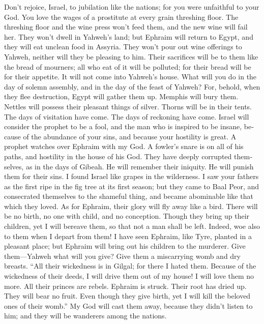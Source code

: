 \begin{paracol}{2}
\begin{otherlanguage}{english}
 Don't rejoice, Israel, to jubilation like the nations;
for you were unfaithful to your God. You love the wages of a prostitute
at every grain threshing floor.  The threshing floor and
the wine press won't feed them, and the new wine will fail her.
 They won't dwell in Yahweh's land; but Ephraim will
return to Egypt, and they will eat unclean food in Assyria.
 They won't pour out wine offerings to Yahweh, neither
will they be pleasing to him. Their sacrifices will be to them like the
bread of mourners; all who eat of it will be polluted; for their bread
will be for their appetite. It will not come into Yahweh's house.
 What will you do in the day of solemn assembly, and in
the day of the feast of Yahweh?  For, behold, when they
flee destruction, Egypt will gather them up. Memphis will bury them.
Nettles will possess their pleasant things of silver. Thorns will be in
their tents.  The days of visitation have come. The days
of reckoning have come. Israel will consider the prophet to be a fool,
and the man who is inspired to be insane, because of the abundance of
your sins, and because your hostility is great.  A prophet
watches over Ephraim with my God. A fowler's snare is on all of his
paths, and hostility in the house of his God.  They have
deeply corrupted themselves, as in the days of Gibeah. He will remember
their iniquity. He will punish them for their sins.  I
found Israel like grapes in the wilderness. I saw your fathers as the
first ripe in the fig tree at its first season; but they came to Baal
Peor, and consecrated themselves to the shameful thing, and became
abominable like that which they loved.  As for Ephraim,
their glory will fly away like a bird. There will be no birth, no one
with child, and no conception.  Though they bring up
their children, yet I will bereave them, so that not a man shall be
left. Indeed, woe also to them when I depart from them! 
I have seen Ephraim, like Tyre, planted in a pleasant place; but Ephraim
will bring out his children to the murderer.  Give
them---Yahweh what will you give? Give them a miscarrying womb and dry
breasts.  ``All their wickedness is in Gilgal; for there
I hated them. Because of the wickedness of their deeds, I will drive
them out of my house! I will love them no more. All their princes are
rebels.  Ephraim is struck. Their root has dried up. They
will bear no fruit. Even though they give birth, yet I will kill the
beloved ones of their womb.''  My God will cast them
away, because they didn't listen to him; and they will be wanderers
among the nations.


\end{otherlanguage}
\end{paracol}
